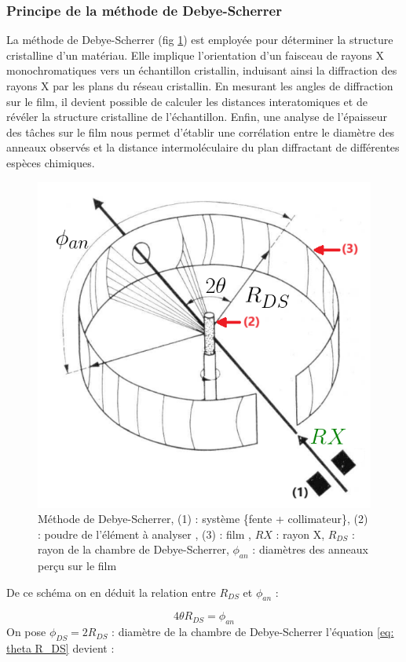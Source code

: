 \subsubsection{Principe de la méthode de Debye-Scherrer}

La méthode de Debye-Scherrer (fig \ref{fig:methodededebyescherrer}) est employée pour déterminer la structure cristalline d'un matériau. Elle implique l'orientation d'un faisceau de rayons X monochromatiques vers un échantillon cristallin, induisant ainsi la diffraction des rayons X par les plans du réseau cristallin. En mesurant les angles de diffraction sur le film, il devient possible de calculer les distances interatomiques et de révéler la structure cristalline de l'échantillon. Enfin, une analyse de l'épaisseur des tâches sur le film nous permet d'établir une corrélation entre le diamètre des anneaux observés et la distance intermoléculaire du plan diffractant de différentes espèces chimiques.





\begin{figure}[h!]
	\centering
	\includegraphics[width=0.6\linewidth]{Méthode_de_Debye_Scherrer/Méthode_de_Debye_Scherrer}
	\caption{\centering Méthode de Debye-Scherrer, (1) : système \{fente + collimateur\}, (2) : poudre de l'élément à analyser , (3) : film , $RX$ : rayon X, $R_{DS}$ : rayon de la chambre de Debye-Scherrer,  $\phi_{an}$ : diamètres des anneaux perçu sur le film}
	\label{fig:methodededebyescherrer}
\end{figure}

De ce schéma on en déduit la relation entre $R_{DS}$ et $\phi_{an}$ :

\begin{equation}\label{eq: theta R_DS}
	4\theta R_{DS} = \phi_{an}
\end{equation}
On pose  $\phi_{DS} = 2R_{DS}$ : diamètre de la chambre de Debye-Scherrer l'équation \eqref{eq: theta R_DS} devient :

